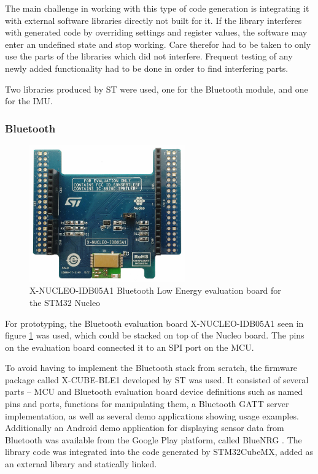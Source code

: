 The main challenge in working with this type of code generation is integrating it with external software libraries directly not built for it. If the library interferes with generated code by overriding settings and register values, the software may enter an undefined state and stop working. Care therefor had to be taken to only use the parts of the libraries which did not interfere. Frequent testing of any newly added functionality had to be done in order to find interfering parts.

Two libraries produced by ST were used, one for the Bluetooth module, and one for the IMU.

\subsubsection{Bluetooth}
\label{bluetooth}

\begin{figure}[H]
\centering
\includegraphics[width=0.6\textwidth]{Figures/x-nucleo-idb05a1.jpg}
\caption{X-NUCLEO-IDB05A1 Bluetooth Low Energy evaluation board for the STM32 Nucleo}
\label{bt-eval-board}
\end{figure}

For prototyping, the Bluetooth evaluation board X-NUCLEO-IDB05A1 \cite{x-nucleo-idb05a1} seen in figure \ref{bt-eval-board} was used, which could be stacked on top of the Nucleo board. The pins on the evaluation board connected it to an SPI port on the MCU.

To avoid having to implement the Bluetooth stack from scratch, the firmware package called X-CUBE-BLE1 \cite{x-cube-ble1} developed by ST was used. It consisted of several parts -- MCU and Bluetooth evaluation board device definitions such as named pins and ports, functions for manipulating them, a Bluetooth GATT server implementation, as well as several demo applications showing usage examples. Additionally an Android demo application for displaying sensor data from Bluetooth was available from the Google Play platform, called BlueNRG \cite{bluenrg-app}. The library code was integrated into the code generated by STM32CubeMX, added as an external library and statically linked.

